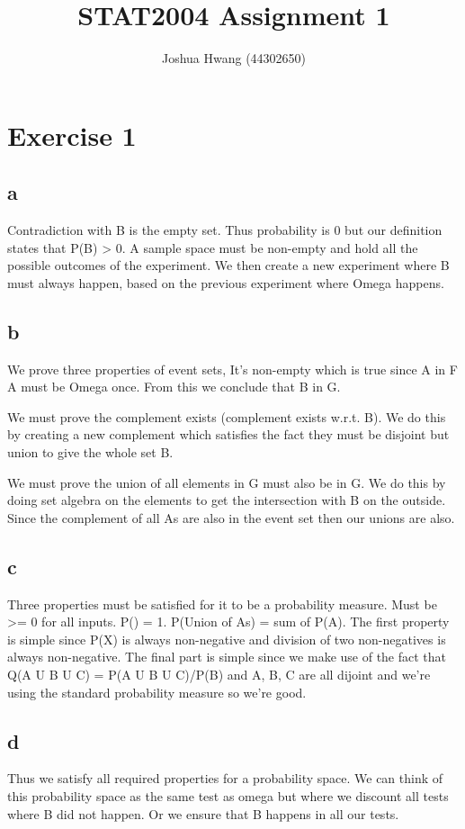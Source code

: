 \documentclass{article}
\title{STAT2004 Assignment 1}
\author{Joshua Hwang (44302650)}
\begin{document}
\maketitle

\section{Exercise 1}
\subsection{a}
Contradiction with B is the empty set. Thus probability is 0 but our definition
states that P(B) > 0.
A sample space must be non-empty and hold all the possible outcomes of the
experiment. We then create a new experiment where B must always happen, based
on the previous experiment where Omega happens.

\subsection{b}
We prove three properties of event sets,
It's non-empty which is true since A in F A must be Omega once. From this
we conclude that B in G.

We must prove the complement exists (complement exists w.r.t. B). We do this
by creating a new complement which satisfies the fact they must be disjoint
but union to give the whole set B.

We must prove the union of all elements in G must also be in G. We do this
by doing set algebra on the elements to get the intersection with B on the
outside. Since the complement of all As are also in the event set then
our unions are also.

\subsection{c}
Three properties must be satisfied for it to be a probability measure.
Must be >= 0 for all inputs. P(\Omega) = 1. P(Union of As) = sum of
P(A).
The first property is simple since P(X) is always non-negative and division
of two non-negatives is always non-negative.
The final part is simple since we make use of the fact that Q(A U B U C)
= P(A U B U C)/P(B) and A, B, C are all dijoint and we're using the standard
probability measure so we're good.

\subsection{d}
Thus we satisfy all required properties for a probability space.
We can think of this probability space as the same test as omega but where
we discount all tests where B did not happen. Or we ensure that B happens
in all our tests.
\end{document}
